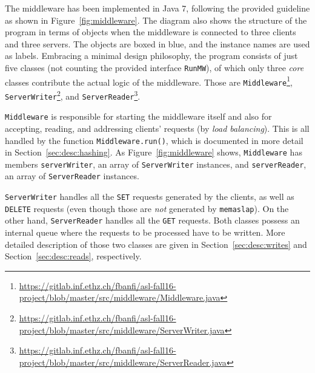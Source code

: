 \documentclass[11pt]{article}
\theoremstyle{definition}
\renewcommand\t\texttt
\begin{document}

The middleware has been implemented in Java 7, following the provided guideline as shown in Figure~\ref{fig:middleware}.
The diagram also shows the structure of the program in terms of objects when the middleware is connected to three clients and three servers.
The objects are boxed in blue, and the instance names are used as labels.
Embracing a minimal design philosophy, the program consists of just five classes (not counting the provided interface \t{RunMW}), of which only three \emph{core} classes contribute the actual logic of the middleware.
Those are \t{Middleware}\footnote{\mbox{\url{https://gitlab.inf.ethz.ch/fbanfi/asl-fall16-project/blob/master/src/middleware/Middleware.java}}}, \t{ServerWriter}\footnote{\mbox{\url{https://gitlab.inf.ethz.ch/fbanfi/asl-fall16-project/blob/master/src/middleware/ServerWriter.java}}}, and \t{ServerReader}\footnote{\mbox{\url{https://gitlab.inf.ethz.ch/fbanfi/asl-fall16-project/blob/master/src/middleware/ServerReader.java}}}.

\t{Middleware} is responsible for starting the middleware itself and also for accepting, reading, and addressing clients' requests (by \emph{load balancing}).
This is all handled by the function \t{Middleware.run()}, which is documented in more detail in Section~\ref{sec:desc:hashing}.
As Figure~\ref{fig:middleware} shows, \t{Middleware} has members \t{serverWriter}, an array of \t{ServerWriter} instances, and \t{serverReader}, an array of \t{ServerReader} instances.

\t{ServerWriter} handles all the \t{SET} requests generated by the clients, as well as \t{DELETE} requests (even though %
those are \emph{not} generated by \t{memaslap}).
On the other hand, \t{ServerReader} handles all the \t{GET} requests. %
Both classes possess an internal queue where the requests to be processed have to be written. %
More detailed description of those two classes are given in Section~\ref{sec:desc:writes} and Section~\ref{sec:desc:reads}, respectively.
\end{document}
